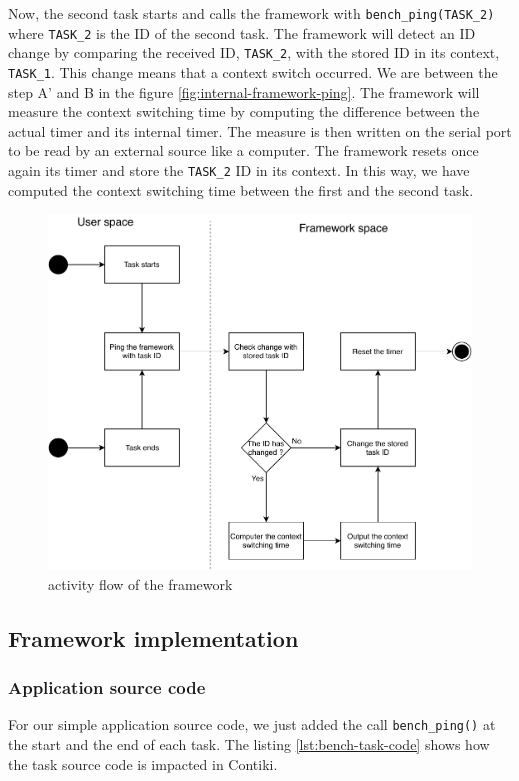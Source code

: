 Now, the second task starts and calls the framework with \texttt{bench\_ping(TASK\_2)} where \texttt{TASK\_2} is the ID of the second task.
The framework will detect an ID change by comparing the received ID, \texttt{TASK\_2}, with the stored ID in its context, \texttt{TASK\_1}.
This change means that a context switch occurred.
We are between the step A' and B in the figure \ref{fig:internal-framework-ping}.
The framework will measure the context switching time by computing the difference between the actual timer and its internal timer.
The measure is then written on the serial port to be read by an external source like a computer.
The framework resets once again its timer and store the \texttt{TASK\_2} ID in its context.
In this way, we have computed the context switching time between the first and the second task.

\begin{figure}[!ht]
  \centering
  \includegraphics[scale=0.7]{assets/extension-activity-framework.pdf}
  \caption{activity flow of the framework\label{fig:extension-activity-framework}}
\end{figure}

\subsection{Framework implementation}

\subsubsection{Application source code}
For our simple application source code, we just added the call \texttt{bench\_ping()} at the start and the end of each task.
The listing \ref{lst:bench-task-code} shows how the task source code is impacted in Contiki.

